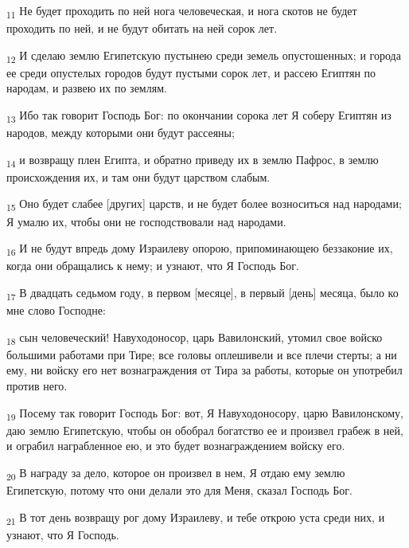 \begin{tcolorbox}
\textsubscript{11} Не будет проходить по ней нога человеческая, и нога скотов не будет проходить по ней, и не будут обитать на ней сорок лет.
\end{tcolorbox}
\begin{tcolorbox}
\textsubscript{12} И сделаю землю Египетскую пустынею среди земель опустошенных; и города ее среди опустелых городов будут пустыми сорок лет, и рассею Египтян по народам, и развею их по землям.
\end{tcolorbox}
\begin{tcolorbox}
\textsubscript{13} Ибо так говорит Господь Бог: по окончании сорока лет Я соберу Египтян из народов, между которыми они будут рассеяны;
\end{tcolorbox}
\begin{tcolorbox}
\textsubscript{14} и возвращу плен Египта, и обратно приведу их в землю Пафрос, в землю происхождения их, и там они будут царством слабым.
\end{tcolorbox}
\begin{tcolorbox}
\textsubscript{15} Оно будет слабее [других] царств, и не будет более возноситься над народами; Я умалю их, чтобы они не господствовали над народами.
\end{tcolorbox}
\begin{tcolorbox}
\textsubscript{16} И не будут впредь дому Израилеву опорою, припоминающею беззаконие их, когда они обращались к нему; и узнают, что Я Господь Бог.
\end{tcolorbox}
\begin{tcolorbox}
\textsubscript{17} В двадцать седьмом году, в первом [месяце], в первый [день] месяца, было ко мне слово Господне:
\end{tcolorbox}
\begin{tcolorbox}
\textsubscript{18} сын человеческий! Навуходоносор, царь Вавилонский, утомил свое войско большими работами при Тире; все головы оплешивели и все плечи стерты; а ни ему, ни войску его нет вознаграждения от Тира за работы, которые он употребил против него.
\end{tcolorbox}
\begin{tcolorbox}
\textsubscript{19} Посему так говорит Господь Бог: вот, Я Навуходоносору, царю Вавилонскому, даю землю Египетскую, чтобы он обобрал богатство ее и произвел грабеж в ней, и ограбил награбленное ею, и это будет вознаграждением войску его.
\end{tcolorbox}
\begin{tcolorbox}
\textsubscript{20} В награду за дело, которое он произвел в нем, Я отдаю ему землю Египетскую, потому что они делали это для Меня, сказал Господь Бог.
\end{tcolorbox}
\begin{tcolorbox}
\textsubscript{21} В тот день возвращу рог дому Израилеву, и тебе открою уста среди них, и узнают, что Я Господь.
\end{tcolorbox}
